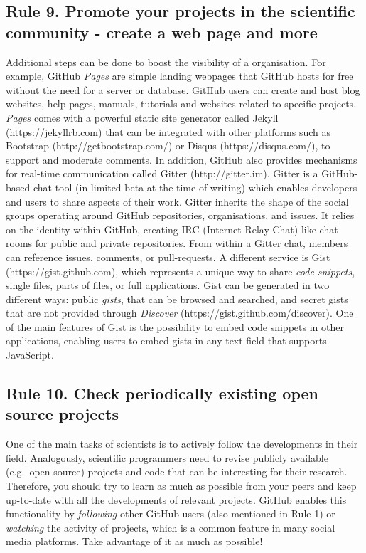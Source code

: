 \documentclass[10pt,letterpaper]{article}
\begin{document}
\subsection*{Rule 9. Promote your projects in the scientific community -
create a web page and
more}\label{rule-9.-promote-your-projects-in-the-scientific-community---create-a-web-page-and-more}

Additional steps can be done to boost the visibility of a organisation.
For example, GitHub \emph{Pages} are simple landing webpages that GitHub
hosts for free without the need for a server or database. GitHub users
can create and host blog websites, help pages, manuals, tutorials and
websites related to specific projects. \emph{Pages} comes with a
powerful static site generator called Jekyll (https://jekyllrb.com) that
can be integrated with other platforms such as Bootstrap
(http://getbootstrap.com/) or Disqus (https://disqus.com/), to support
and moderate comments. In addition, GitHub also provides mechanisms for
real-time communication called Gitter (http://gitter.im). Gitter is a
GitHub-based chat tool (in limited beta at the time of writing) which
enables developers and users to share aspects of their work. Gitter
inherits the shape of the social groups operating around GitHub
repositories, organisations, and issues. It relies on the identity
within GitHub, creating IRC (Internet Relay Chat)-like chat rooms for
public and private repositories. From within a Gitter chat, members can
reference issues, comments, or pull-requests. A different service is
Gist (https://gist.github.com), which represents a unique way to share
\emph{code snippets}, single files, parts of files, or full
applications. Gist can be generated in two different ways: public
\emph{gists}, that can be browsed and searched, and secret gists that
are not provided through \emph{Discover}
(https://gist.github.com/discover). One of the main features of Gist is
the possibility to embed code snippets in other applications, enabling
users to embed gists in any text field that supports JavaScript.

\subsection*{Rule 10. Check periodically existing open source
projects}\label{rule-10.-check-periodically-existing-open-source-projects}

One of the main tasks of scientists is to actively follow the
developments in their field. Analogously, scientific programmers need to
revise publicly available (e.g.~open source) projects and code that can
be interesting for their research. Therefore, you should try to learn as
much as possible from your peers and keep up-to-date with all the
developments of relevant projects. GitHub enables this functionality by
\emph{following} other GitHub users (also mentioned in Rule 1) or
\emph{watching} the activity of projects, which is a common feature in
many social media platforms. Take advantage of it as much as possible!
\end{document}
